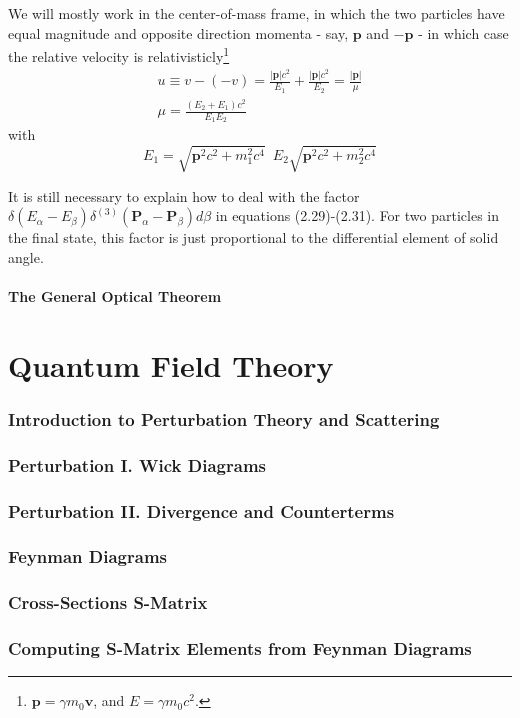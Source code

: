 \documentclass[12pt]{article}
\numberwithin{equation}{section}
\begin{document}
We will mostly work in the center-of-mass frame, in which the two particles have equal magnitude and opposite direction momenta - say, $\mathbf{p}$ and $-\mathbf{p}$ - in which case the relative velocity is relativisticly\footnote{$\mathbf{p} = \gamma m_0\mathbf{v}$, and $E=\gamma m_0c^2$.}
\begin{equation}
    \begin{split}
        u \equiv v-(-v) = \frac{|\mathbf{p}|c^2}{E_1}+\frac{|\mathbf{p}|c^2}{E_2} = \frac{|\mathbf{p}|}{\mu}\\
        \mu = \frac{(E_{2}+E_{1})c^2}{E_{1}E_{2}}
    \end{split}
\end{equation}
with 
\[E_1 = \sqrt{\mathbf{p}^2c^2+m_1^2c^4}\,\,\,E_2\sqrt{\mathbf{p}^2c^2+m_2^2c^4}\]

It is still necessary to explain how to deal with the factor $\delta(E_{\alpha}-E_{\beta})\delta^{(3)}(\mathbf{P}_{\alpha}-\mathbf{P}_{\beta})d\beta$ in equations (2.29)-(2.31).
For two particles in the final state, this factor is just proportional to the differential element of solid angle.

\subsection{The General Optical Theorem}
\part{Quantum Field Theory}
\section{Introduction to Perturbation Theory and Scattering} 
\section{Perturbation I. Wick Diagrams}
\section{Perturbation II. Divergence and Counterterms}
\section{Feynman Diagrams}
\section{Cross-Sections S-Matrix}
\section{Computing S-Matrix Elements from Feynman Diagrams}
\end{document}

